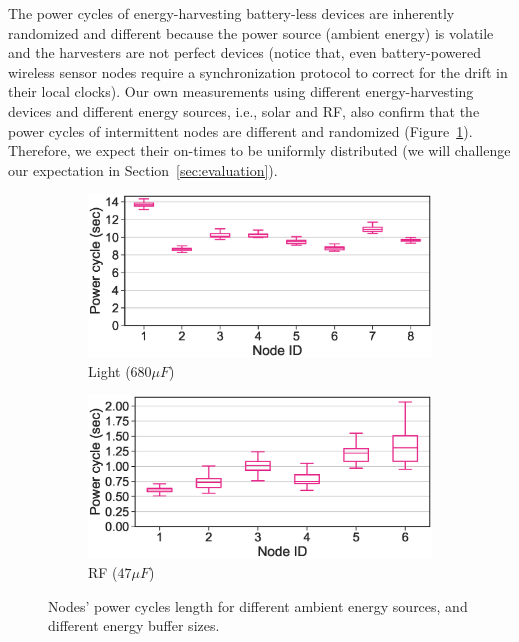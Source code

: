 The power cycles of energy-harvesting battery-less devices are inherently randomized and different because the power source (ambient energy) is volatile and the harvesters are not perfect devices (notice that, even battery-powered wireless sensor nodes require a synchronization protocol to correct for the drift in their local clocks). Our own measurements using different energy-harvesting devices and different energy sources, i.e., solar and RF, also confirm that the power cycles of intermittent nodes are different and randomized (Figure~\ref{fig:power_cycles}). Therefore, we expect their on-times to be uniformly distributed (we will challenge our expectation in Section~\ref{sec:evaluation}). 
%
\begin{figure}[t]
		\begin{subfigure}{.49\columnwidth}
			\centering
			\includegraphics[width=\textwidth]{figures/light_power_cycles_len}
			\caption{Light ($680\si{\mu F}$) }
		\end{subfigure}\hfill
		\begin{subfigure}{.49\columnwidth}
			\centering
			\includegraphics[width=\textwidth]{figures/rf_power_cycles_len}
			\caption{RF ($47\si{\mu F}$)}
		\end{subfigure}\hfill
		\caption{Nodes' power cycles length for different ambient energy sources, and different energy buffer sizes.}
		\label{fig:power_cycles}
\end{figure} 
%
